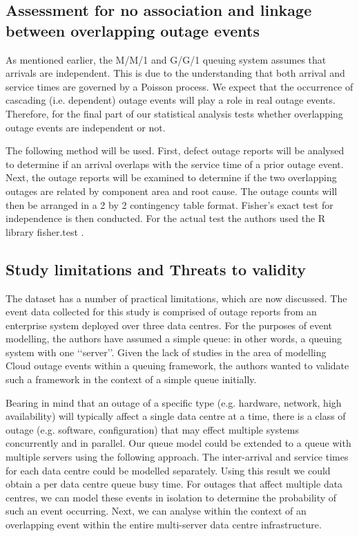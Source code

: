 \documentclass[5p]{elsarticle}
\begin{document}
\subsection{Assessment for no association and linkage between overlapping outage events}

As mentioned earlier, the M/M/1 and G/G/1 queuing system assumes that arrivals are independent. This is due to the understanding that both arrival and service times are governed by a Poisson process. We expect that the occurrence of cascading (i.e. dependent) outage events will play a role in real outage events. Therefore, for the final part of our statistical analysis tests whether overlapping outage events are independent or not. 

The following method will be used. First, defect outage reports will be analysed to determine if an arrival overlaps with the service time of a prior outage event. Next, the outage reports will be examined to determine if the two overlapping outages are related by component area and root cause. The outage counts will then be arranged in a 2 by 2 contingency table format. Fisher's exact test for independence \cite{fisher1922interpretation,fisher1925statistical} is then conducted. For the actual test the authors used the R library fisher.test \cite{FisherExact}. 

\subsection{Study limitations and Threats to validity}

The dataset has a number of practical limitations, which are now discussed. The event data collected for this study is comprised of outage reports from an enterprise system deployed over three data centres. For the purposes of event modelling, the authors have assumed a simple queue: in other words, a queuing system with one \lq\lq server\rq\rq. Given the lack of studies in the area of modelling Cloud outage events within a queuing framework, the authors wanted to validate such a framework in the context of a simple queue initially. 

Bearing in mind that an outage of a specific type (e.g. hardware, network, high availability) will typically affect a single data centre at a time, there is a class of outage (e.g. software, configuration) that may effect multiple systems concurrently and in parallel. Our queue model could be extended to a queue with multiple servers using the following approach. The inter-arrival and service times for each data centre could be modelled separately. Using this result we could obtain a per data centre queue busy time. For outages that affect multiple data centres, we can model these events in isolation to determine the probability of such an event occurring. Next, we can analyse within the context of an overlapping event within the entire multi-server data centre infrastructure.
\end{document}
